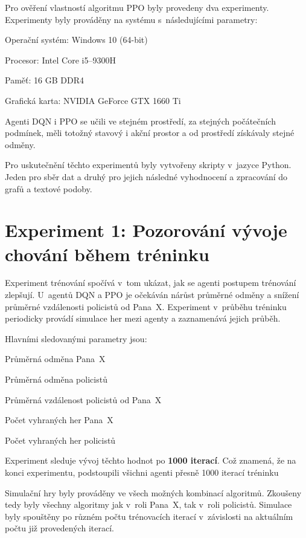 Pro ověření vlastností algoritmu PPO byly provedeny dva experimenty.
Experimenty byly prováděny na systému s~následujícími parametry:

\begin{myitemize}
  \item Operační systém: Windows 10 (64-bit)
  \item Procesor: Intel Core i5--9300H
  \item Paměť: 16 GB DDR4
  \item Grafická karta: NVIDIA GeForce GTX 1660 Ti
\end{myitemize}

Agenti DQN i PPO se učili ve stejném prostředí, za stejných počátečních podmínek, měli totožný stavový i akční prostor a od prostředí získávaly stejné odměny.

Pro uskutečnění těchto experimentů byly vytvořeny skripty v~jazyce Python.
Jeden pro sběr dat a druhý pro jejich následné vyhodnocení a zpracování do grafů a textové podoby.

\section{Experiment 1: Pozorování vývoje chování během tréninku}
\label{sec:experiment-1}

Experiment trénování spočívá v~tom ukázat, jak se agenti postupem trénování zlepšují.
U~agentů DQN a PPO je očekáván nárůst průměrné odměny a snížení průměrné vzdálenosti policistů od Pana~X\@.
Experiment v~průběhu tréninku periodicky provádí simulace her mezi agenty a zaznamenává jejich průběh.

\bigskip
\noindent Hlavními sledovanými parametry jsou:
\begin{myitemize}
  \item Průměrná odměna Pana~X
  \item Průměrná odměna policistů
  \item Průměrná vzdálenost policistů od Pana~X
  \item Počet vyhraných her Pana~X
  \item Počet vyhraných her policistů
\end{myitemize}
Experiment sleduje vývoj těchto hodnot po \textbf{1000 iterací}.
Což znamená, že na konci experimentu, podstoupili všichni agenti přesně 1000 iterací tréninku

Simulační hry byly prováděny ve všech možných kombinací algoritmů.
Zkoušeny tedy byly všechny algoritmy jak v~roli Pana~X, tak v~roli policistů.
Simulace byly spouštěny po různém počtu trénovacích iterací v~závislosti na aktuálním počtu již provedených iterací.\pagebreak

